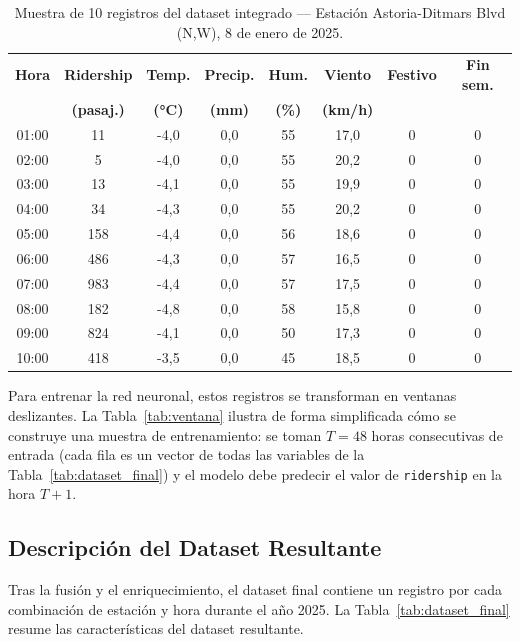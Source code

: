 \documentclass[preprint,12pt]{elsarticle}
\begin{document}
\begin{table}[htbp]
\centering
\caption{Muestra de 10 registros del dataset integrado — Estación Astoria-Ditmars Blvd (N,W), 8 de enero de 2025.}
\label{tab:muestra}
\small
\begin{tabular}{cccccccc}
\toprule
\textbf{Hora} & \textbf{Ridership} & \textbf{Temp.} & \textbf{Precip.} & \textbf{Hum.} & \textbf{Viento} & \textbf{Festivo} & \textbf{Fin sem.} \\
 & \textbf{(pasaj.)} & \textbf{(°C)} & \textbf{(mm)} & \textbf{(\%)} & \textbf{(km/h)} & & \\
\midrule
01:00 & 11  & -4,0 & 0,0 & 55 & 17,0 & 0 & 0 \\
02:00 & 5   & -4,0 & 0,0 & 55 & 20,2 & 0 & 0 \\
03:00 & 13  & -4,1 & 0,0 & 55 & 19,9 & 0 & 0 \\
04:00 & 34  & -4,3 & 0,0 & 55 & 20,2 & 0 & 0 \\
05:00 & 158 & -4,4 & 0,0 & 56 & 18,6 & 0 & 0 \\
06:00 & 486 & -4,3 & 0,0 & 57 & 16,5 & 0 & 0 \\
07:00 & 983 & -4,4 & 0,0 & 57 & 17,5 & 0 & 0 \\
08:00 & 182 & -4,8 & 0,0 & 58 & 15,8 & 0 & 0 \\
09:00 & 824 & -4,1 & 0,0 & 50 & 17,3 & 0 & 0 \\
10:00 & 418 & -3,5 & 0,0 & 45 & 18,5 & 0 & 0 \\
\bottomrule
\end{tabular}
\end{table}

Para entrenar la red neuronal, estos registros se transforman en ventanas deslizantes. La Tabla~\ref{tab:ventana} ilustra de forma simplificada cómo se construye una muestra de entrenamiento: se toman $T = 48$ horas consecutivas de entrada (cada fila es un vector de todas las variables de la Tabla~\ref{tab:dataset_final}) y el modelo debe predecir el valor de \texttt{ridership} en la hora $T+1$.

\subsection{Descripción del Dataset Resultante}

Tras la fusión y el enriquecimiento, el dataset final contiene un registro por cada combinación de estación y hora durante el año 2025. La Tabla~\ref{tab:dataset_final} resume las características del dataset resultante.
\end{document}
